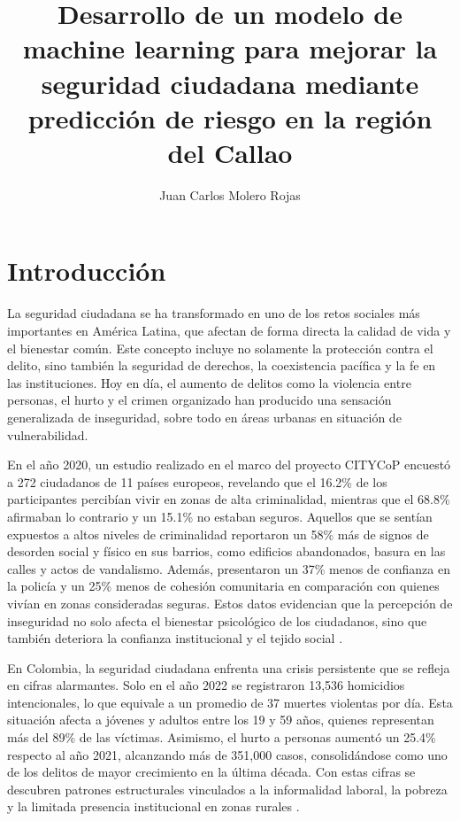 \documentclass[runningheads]{llncs}
\begin{document}
\title{Desarrollo de un modelo de machine learning para mejorar la seguridad
ciudadana mediante predicción de riesgo en la región del Callao}

\author{Juan Carlos Molero Rojas}


\maketitle

\begin{abstract}
\end{abstract}

\section{Introducción}

La seguridad ciudadana se ha transformado en uno de los retos sociales más
importantes en América Latina, que afectan de forma directa la calidad de vida
y el bienestar común. Este concepto incluye no solamente la protección contra
el delito, sino también la seguridad de derechos, la coexistencia pacífica y la
fe en las instituciones. Hoy en día, el aumento de delitos como la violencia
entre personas, el hurto y el crimen organizado han producido una sensación
generalizada de inseguridad, sobre todo en áreas urbanas en situación de
vulnerabilidad.

En el año 2020, un estudio realizado en el marco del proyecto CITYCoP encuestó
a 272 ciudadanos de 11 países europeos, revelando que el 16.2\% de los
participantes percibían vivir en zonas de alta criminalidad, mientras que el
68.8\% afirmaban lo contrario y un 15.1\% no estaban seguros. Aquellos que se
sentían expuestos a altos niveles de criminalidad reportaron un 58\% más de
signos de desorden social y físico en sus barrios, como edificios abandonados,
basura en las calles y actos de vandalismo. Además, presentaron un 37\% menos
de confianza en la policía y un 25\% menos de cohesión comunitaria en
comparación con quienes vivían en zonas consideradas seguras. Estos datos
evidencian que la percepción de inseguridad no solo afecta el bienestar
psicológico de los ciudadanos, sino que también deteriora la confianza
institucional y el tejido social \cite{reid2020}.

En Colombia, la seguridad ciudadana enfrenta una crisis persistente que se
refleja en cifras alarmantes. Solo en el año 2022 se registraron 13,536
homicidios intencionales, lo que equivale a un promedio de 37 muertes violentas
por día. Esta situación afecta a jóvenes y adultos entre los 19 y 59 años,
quienes representan más del 89\% de las víctimas. Asimismo, el hurto a personas
aumentó un 25.4\% respecto al año 2021, alcanzando más de 351,000 casos,
consolidándose como uno de los delitos de mayor crecimiento en la última
década. Con estas cifras se descubren patrones estructurales vinculados a la
informalidad laboral, la pobreza y la limitada presencia institucional en zonas
rurales \cite{nunez2024}.
\end{document}

